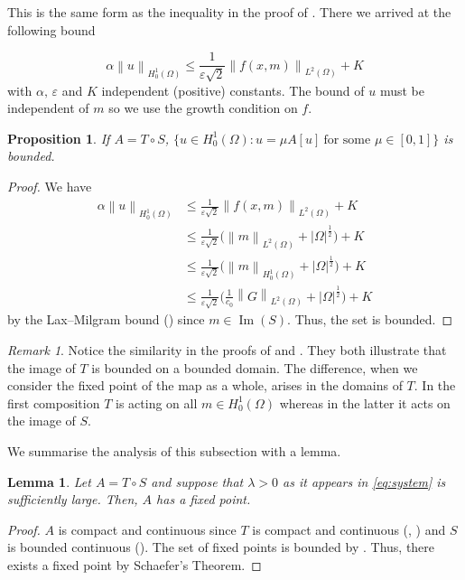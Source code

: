 \documentclass[11pt]{article}
\numberwithin{equation}{section}
\newtheorem{lemma}[lemma]{Lemma}
\newtheorem{proposition}[proposition]{Proposition}
\theoremstyle{definition}
\theoremstyle{remark}
\newtheorem{remark}[remark]{Remark}
\newcommand{\Ltwo}{L^2(\Omega)}
\newcommand{\Honez}{H_0^1(\Omega)}
\newcommand{\norm}[1]{\left\lVert #1 \right\rVert}
\begin{document}
This is the same form as the inequality in the proof of . There we arrived at the following bound 

\[\alpha \norm{u}_{\Honez} \le \frac{1}{\varepsilon \sqrt{2}} \norm{f(x,m)}_{\Ltwo}+ K\]
with $\alpha, \, \varepsilon$ and $K$  independent (positive) constants.
The bound of $u$ must be independent of $m$ so we use the growth condition on $f$.
\begin{proposition}
  \label{prop:revA_bounded}
  If $A = T \circ S$, ${\{u\in\Honez: u=\mu A[u]\ \text{for some }\mu\in[0,1]\}}$ is bounded. 
\end{proposition} 
\begin{proof}
  We have
  \begin{align*}
    \alpha \norm{u}_{\Honez}
    &\le \frac{1}{\varepsilon \sqrt{2}} \norm{f(x,m)}_{\Ltwo}+ K\\
    &\le \frac{1}{\varepsilon \sqrt{2}} \bigl(\norm{m}_{\Ltwo} + |\Omega|^\frac12\bigr)+ K\\
    &\le \frac{1}{\varepsilon \sqrt{2}} \bigl(\norm{m}_{\Honez} + |\Omega|^\frac12\bigr)+ K\\
    &\le \frac{1}{\varepsilon \sqrt{2}} \bigl(\frac{1}{c_0}\norm{G}_{\Ltwo} + |\Omega|^\frac12\bigr)+ K
  \end{align*}
  by the Lax--Milgram bound () since $m \in \operatorname{Im}(S)$. Thus, the set is bounded.
\end{proof}
\begin{remark}
  Notice the similarity in the proofs of  and . They both illustrate that the image of $T$ is bounded on a bounded domain. 
  The difference, when we consider the fixed point of the map as a whole, arises in the domains of $T$. In the first composition $T$ is acting on all $m \in \Honez$ whereas in the latter it acts on 
  the image of $S$. 
\end{remark}
We summarise the analysis of this subsection with a lemma. 
\begin{lemma}
  Let $A= T \circ S$ and suppose that $\lambda > 0$ as it appears in \cref{eq:system} is sufficiently large. 
  Then, $A$ has a fixed point.
\end{lemma}
\begin{proof}
  $A$ is compact and continuous since $T$ is compact and continuous (, ) and $S$ is bounded continuous ().
  The set of fixed points is bounded by . 
  Thus, there exists a fixed point by Schaefer's Theorem. 
\end{proof}
\end{document}
